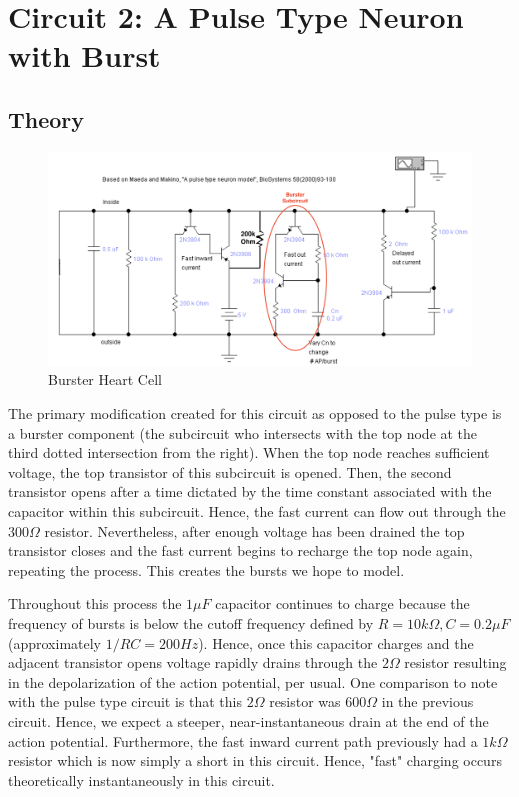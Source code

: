 \documentclass[12]{book}
\newcommand\0{\mathbf{0}}
\newcommand\<{\langle}
\renewcommand\>{\rangle}
\begin{document}
\section{Circuit 2: A Pulse Type Neuron with Burst}

\subsection{Theory}

\begin{figure}[h]
\centering
\includegraphics[width=\textwidth]{burster_heart_cell}	
\caption{Burster Heart Cell}
\end{figure}

The primary modification created for this circuit as opposed to the pulse type is a burster component (the subcircuit who intersects with the top node at the third dotted intersection from the right). When the top node reaches sufficient voltage, the top transistor of this subcircuit is opened. Then, the second transistor opens after a time dictated by the time constant associated with the capacitor within this subcircuit. Hence, the fast current can flow out through the $300 \Omega$ resistor. Nevertheless, after enough voltage has been drained the top transistor closes and the fast current begins to recharge the top node again, repeating the process. This creates the bursts we hope to model.

Throughout this process the $1 \mu F$ capacitor continues to charge because the frequency of bursts is below the cutoff frequency defined by $R = 10k \Omega, C = 0.2 \mu F$ (approximately $1/RC = 200 Hz$). Hence, once this capacitor charges and the adjacent transistor opens voltage rapidly drains through the $2 \Omega$ resistor resulting in the depolarization of the action potential, per usual. One comparison to note with the pulse type circuit is that this $2 \Omega$ resistor was $600 \Omega$ in the previous circuit. Hence, we expect a steeper, near-instantaneous drain at the end of the action potential. Furthermore, the fast inward current path previously had a $1k \Omega$ resistor which is now simply a short in this circuit. Hence, "fast" charging occurs theoretically instantaneously in this circuit.
\end{document}
